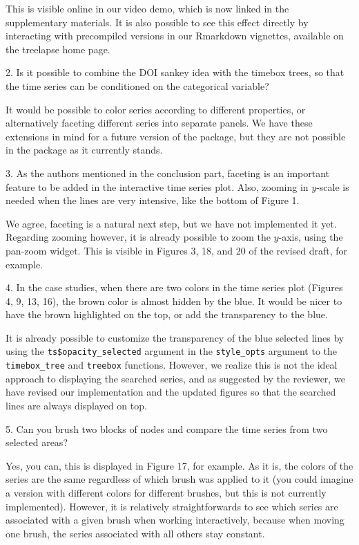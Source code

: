 \documentclass{article}
\begin{document}
\color{black}
This is visible online in our video demo, which is now linked in the
supplementary materials. It is also possible to see this effect directly by
interacting with precompiled versions in our Rmarkdown vignettes, available on
the treelapse home page.

\color{blue} 2. Is it possible to combine the DOI sankey idea with the timebox trees,
  so that the time series can be conditioned on the categorical variable?

\color{black}
It would be possible to color series according to different properties, or
alternatively faceting different series into separate panels. We have these
extensions in mind for a future version of the package, but they are not
possible in the package as it currently stands.

\color{blue} 3. As the authors mentioned in the conclusion part, faceting is an
  important feature to be added in the interactive time series plot. Also,
  zooming in $y$-scale is needed when the lines are very intensive, like the
  bottom of Figure 1.

\color{black}
We agree, faceting is a natural next step, but we have not implemented it yet.
Regarding zooming however, it is already possible to zoom the $y$-axis, using
the pan-zoom widget. This is visible in Figures 3, 18, and 20 of the revised
draft, for example.

\color{blue} 4. In the case studies, when there are two colors in the time series plot
  (Figures 4, 9, 13, 16), the brown color is almost hidden by the blue. It would
  be nicer to have the brown highlighted on the top, or add the transparency to
  the blue.

\color{black}
It is already possible to customize the transparency of the blue selected lines
by using the \texttt{ts\$opacity\_selected} argument in the \texttt{style\_opts}
argument to the \texttt{timebox\_tree} and \texttt{treebox} functions. However,
we realize this is not the ideal approach to displaying the searched series, and
as suggested by the reviewer, we have revised our implementation and the updated
figures so that the searched lines are always displayed on top.

\color{blue}

5. Can you brush two blocks of nodes and compare the time series from two
selected areas?

\color{black}
Yes, you can, this is displayed in Figure 17, for example. As it is, the colors
of the series are the same regardless of which brush was applied to it (you
could imagine a version with different colors for different brushes, but this is
not currently implemented). However, it is relatively straightforwards to see
which series are associated with a given brush when working interactively,
because when moving one brush, the series associated with all others stay
constant.
\end{document}
